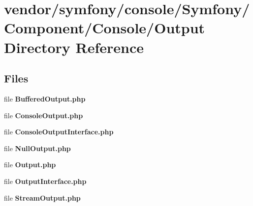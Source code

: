 \section{vendor/symfony/console/\+Symfony/\+Component/\+Console/\+Output Directory Reference}
\label{dir_41ad5b09655988a25a5a52a1490a6583}
\subsection*{Files}
\begin{DoxyCompactItemize}
\item 
file {\bf Buffered\+Output.\+php}
\item 
file {\bf Console\+Output.\+php}
\item 
file {\bf Console\+Output\+Interface.\+php}
\item 
file {\bf Null\+Output.\+php}
\item 
file {\bf Output.\+php}
\item 
file {\bf Output\+Interface.\+php}
\item 
file {\bf Stream\+Output.\+php}
\end{DoxyCompactItemize}
